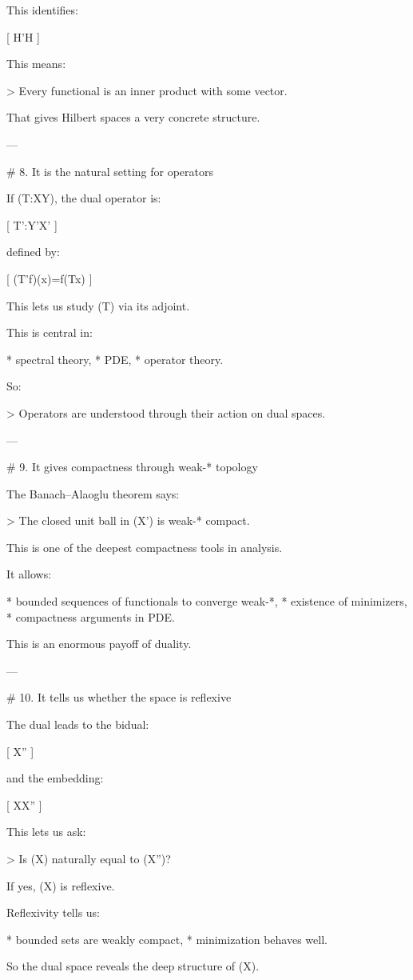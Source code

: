 \begin{description}
This identifies:

[
H'\cong H
]

This means:

> Every functional is an inner product with some vector.

That gives Hilbert spaces a very concrete structure.

---

# 8. It is the natural setting for operators

If (T:X\to Y), the dual operator is:

[
T':Y'\to X'
]

defined by:

[
(T'f)(x)=f(Tx)
]

This lets us study (T) via its adjoint.

This is central in:

* spectral theory,
* PDE,
* operator theory.

So:

> Operators are understood through their action on dual spaces.

---

# 9. It gives compactness through weak-* topology

The Banach–Alaoglu theorem says:

> The closed unit ball in (X') is weak-* compact.

This is one of the deepest compactness tools in analysis.

It allows:

* bounded sequences of functionals to converge weak-*,
* existence of minimizers,
* compactness arguments in PDE.

This is an enormous payoff of duality.

---

# 10. It tells us whether the space is reflexive

The dual leads to the bidual:

[
X''
]

and the embedding:

[
X\hookrightarrow X''
]

This lets us ask:

> Is (X) naturally equal to (X'')?

If yes, (X) is reflexive.

Reflexivity tells us:

* bounded sets are weakly compact,
* minimization behaves well.

So the dual space reveals the deep structure of (X).


\end{description}
